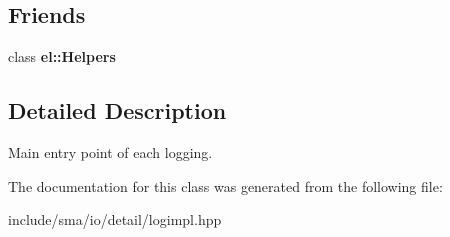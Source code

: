 \subsection*{Friends}
\begin{DoxyCompactItemize}
\item 
\hypertarget{classel_1_1base_1_1Writer_a2fb8a2c02cbf86247f093c118bed877a}{class {\bfseries el\-::\-Helpers}}\label{classel_1_1base_1_1Writer_a2fb8a2c02cbf86247f093c118bed877a}

\end{DoxyCompactItemize}


\subsection{Detailed Description}
Main entry point of each logging. 

The documentation for this class was generated from the following file\-:\begin{DoxyCompactItemize}
\item 
include/sma/io/detail/logimpl.\-hpp\end{DoxyCompactItemize}

